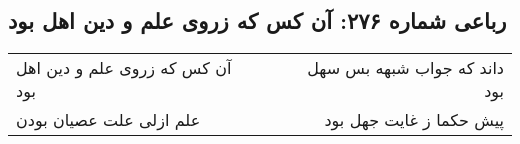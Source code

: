 \begin{center}
\section*{رباعی شماره ۲۷۶: آن کس که زروی علم و دین اهل بود}
\label{sec:sh276}
\begin{longtable}{l p{0.5cm} r}
آن کس که زروی علم و دین اهل بود
&&
داند که جواب شبهه بس سهل بود
\\
علم ازلی علت عصیان بودن
&&
پیش حکما ز غایت جهل بود
\\
\end{longtable}
\end{center}
